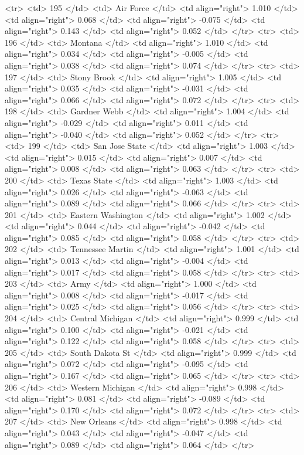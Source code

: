   <tr> <td> 195 </td> <td> Air Force </td> <td align="right"> 1.010 </td> <td align="right"> 0.068 </td> <td align="right"> -0.075 </td> <td align="right"> 0.143 </td> <td align="right"> 0.052 </td> </tr>
  <tr> <td> 196 </td> <td> Montana </td> <td align="right"> 1.010 </td> <td align="right"> 0.034 </td> <td align="right"> -0.005 </td> <td align="right"> 0.038 </td> <td align="right"> 0.074 </td> </tr>
  <tr> <td> 197 </td> <td> Stony Brook </td> <td align="right"> 1.005 </td> <td align="right"> 0.035 </td> <td align="right"> -0.031 </td> <td align="right"> 0.066 </td> <td align="right"> 0.072 </td> </tr>
  <tr> <td> 198 </td> <td> Gardner Webb </td> <td align="right"> 1.004 </td> <td align="right"> -0.029 </td> <td align="right"> 0.011 </td> <td align="right"> -0.040 </td> <td align="right"> 0.052 </td> </tr>
  <tr> <td> 199 </td> <td> San Jose State </td> <td align="right"> 1.003 </td> <td align="right"> 0.015 </td> <td align="right"> 0.007 </td> <td align="right"> 0.008 </td> <td align="right"> 0.063 </td> </tr>
  <tr> <td> 200 </td> <td> Texas State </td> <td align="right"> 1.003 </td> <td align="right"> 0.026 </td> <td align="right"> -0.063 </td> <td align="right"> 0.089 </td> <td align="right"> 0.066 </td> </tr>
  <tr> <td> 201 </td> <td> Eastern Washington </td> <td align="right"> 1.002 </td> <td align="right"> 0.044 </td> <td align="right"> -0.042 </td> <td align="right"> 0.085 </td> <td align="right"> 0.058 </td> </tr>
  <tr> <td> 202 </td> <td> Tennessee Martin </td> <td align="right"> 1.001 </td> <td align="right"> 0.013 </td> <td align="right"> -0.004 </td> <td align="right"> 0.017 </td> <td align="right"> 0.058 </td> </tr>
  <tr> <td> 203 </td> <td> Army </td> <td align="right"> 1.000 </td> <td align="right"> 0.008 </td> <td align="right"> -0.017 </td> <td align="right"> 0.025 </td> <td align="right"> 0.056 </td> </tr>
  <tr> <td> 204 </td> <td> Central Michigan </td> <td align="right"> 0.999 </td> <td align="right"> 0.100 </td> <td align="right"> -0.021 </td> <td align="right"> 0.122 </td> <td align="right"> 0.058 </td> </tr>
  <tr> <td> 205 </td> <td> South Dakota St </td> <td align="right"> 0.999 </td> <td align="right"> 0.072 </td> <td align="right"> -0.095 </td> <td align="right"> 0.167 </td> <td align="right"> 0.065 </td> </tr>
  <tr> <td> 206 </td> <td> Western Michigan </td> <td align="right"> 0.998 </td> <td align="right"> 0.081 </td> <td align="right"> -0.089 </td> <td align="right"> 0.170 </td> <td align="right"> 0.072 </td> </tr>
  <tr> <td> 207 </td> <td> New Orleans </td> <td align="right"> 0.998 </td> <td align="right"> 0.043 </td> <td align="right"> -0.047 </td> <td align="right"> 0.089 </td> <td align="right"> 0.064 </td> </tr>
